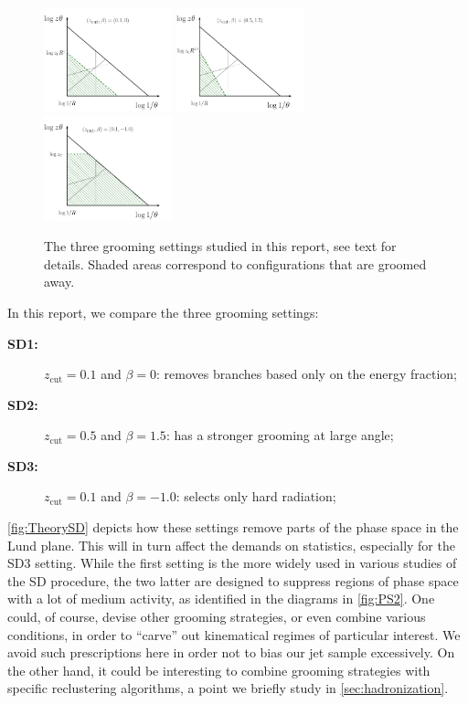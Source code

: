 \begin{figure}[t!]
\centering
\includegraphics[width=0.33\textwidth]{figures/kinematics/plotVac_SD2_3}%
\includegraphics[width=0.33\textwidth]{figures/kinematics/plotVac_SD1_3}%
\includegraphics[width=0.33\textwidth]{figures/kinematics/plotVac_SD3_3}%
\caption{The three grooming settings studied in this report, see text for details. Shaded areas correspond to configurations that are groomed away.}
\label{fig:TheorySD}
\end{figure}
In this report, we compare the three grooming settings:
\begin{description}
\item[{\bf SD1:}] $z_{\text{cut}}=0.1$ and $\beta=0$: removes branches based only on the energy fraction;
\item[{\bf SD2:}]  $z_{\text{cut}}=0.5$ and $\beta=1.5$: has a stronger grooming at large angle;
\item[{\bf SD3:}]  $z_{\text{cut}}=0.1$ and $\beta=-1.0$: selects only hard radiation;
\end{description}
\autoref{fig:TheorySD} depicts how these settings remove parts of the phase space in the Lund plane. This will in turn affect the demands on statistics, especially for the SD3 setting. While the first setting is the more widely used in various studies of the SD procedure, the two latter are designed to suppress regions of phase space with a lot of medium activity, as identified in the diagrams in \autoref{fig:PS2}. One could, of course, devise other grooming strategies, or even combine various conditions, in order to ``carve'' out kinematical regimes of particular interest. We avoid such prescriptions here in order not to bias our jet sample excessively. On the other hand, it could be interesting to combine grooming strategies with specific reclustering algorithms, a point we briefly study in \autoref{sec:hadronization}.

